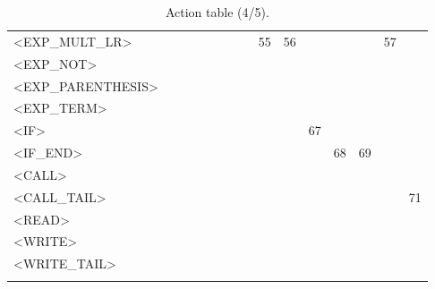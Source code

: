 \documentclass[a4paper,11pt]{article}
\begin{document}
\begin{longtable}{l||cccccccccccccc}
	<EXP\_MULT\_LR> & & & & & & & & 55 & 56 & & & & 57 & \\
	<EXP\_NOT>  & & & & & & & & & & & & & & \\
	<EXP\_PARENTHESIS>  & & & & & & & & & & & & & & \\
	<EXP\_TERM>  & & & & & & & & & & & & & & \\
	<IF>  & & & & & & & & & & 67 & & & & \\
	<IF\_END>  & & & & & & & & & & & 68 & 69 & & \\
	<CALL>  & & & & & & & & & & & & & & \\
	<CALL\_TAIL> & & & & & & & & & & & & & & 71 \\
	<READ>  & & & & & & & & & & & & & & \\
	<WRITE> & & & & & & & & & & & & & & \\
	<WRITE\_TAIL>  & & & & & & & & & & & & & & \\
	\caption{Action table (4/5).}
\end{longtable}
\end{document}
